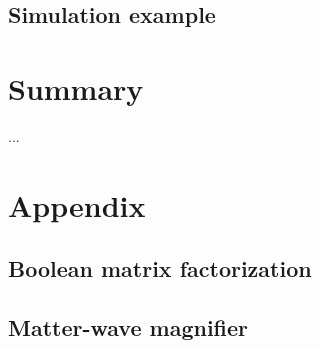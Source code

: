 \documentclass[twoside]{article}
\begin{document}
\subsection{Simulation example}



\newpage
\section{Summary} \label{sec:summary}
...


\newpage
\section{Appendix} \label{sec:appendix}

\subsection{Boolean matrix factorization}


\subsection{Matter-wave magnifier} \label{sec:mwm}

%  



% 


\newpage


\end{document}
